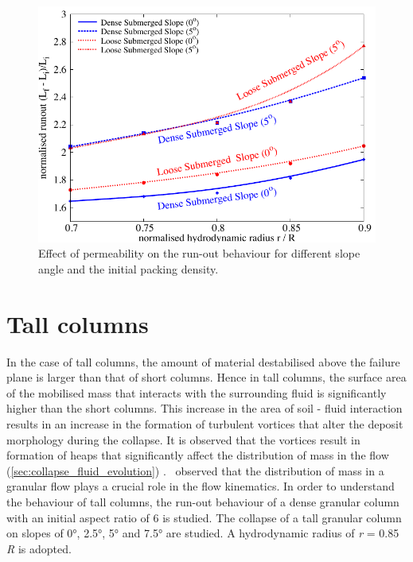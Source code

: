 \begin{figure}
\centering
\includegraphics[width=0.97\columnwidth]{Perm_Runout_slope}
\caption{Effect of permeability on the run-out behaviour for different slope 
angle and the initial packing density.}
\label{fig:Perm_Runout_slope}
\end{figure}

\section{Tall columns}

In the case of tall columns, the amount of material destabilised above the 
failure plane is larger than that of short columns. Hence in tall columns, 
the surface area of the mobilised mass that interacts with the 
surrounding fluid is significantly higher than the short columns. This 
increase in the area of soil - fluid interaction results in an increase
in the formation of turbulent vortices that alter the deposit morphology during 
the collapse. It is observed that the vortices result in formation of heaps 
that significantly affect the distribution of mass in the flow 
(\cref{sec:collapse_fluid_evolution}) .~\citet{Staron2007a} observed that the 
distribution of mass in a granular flow plays a crucial role in the flow 
kinematics. In order to understand the behaviour of tall columns, the run-out 
behaviour of a dense granular column with an initial aspect ratio of 6 is 
studied. The collapse of a tall granular column on slopes of 0\si{\degree}, 
2.5\si{\degree}, 5\si{\degree} and 7.5\si{\degree} are studied. A hydrodynamic 
radius of \textit{r} = 0.85 \textit{R} is adopted. 

